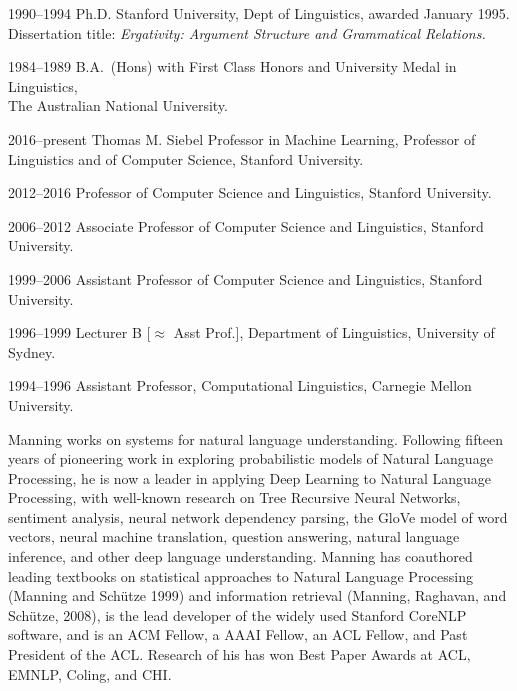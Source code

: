 \documentclass[11pt]{article}
\begin{document}
\begin{vita}
\begin{Professional Preparation}[1990--1994]
\item[1990--1994] Ph.D. Stanford University, Dept of
Linguistics, awarded January 1995.
Dissertation title: {\em Ergativity: Argument Structure and Grammatical
Relations.}
\item[1984--1989] B.A.\ (Hons) with First Class Honors and University
Medal in Linguistics,\\
The Australian National University.
\end{Professional Preparation}

\begin{Appointments}[1996--present]
\item[2016--present] Thomas M. Siebel Professor in Machine Learning, Professor of Linguistics and of Computer Science, Stanford University.
\item[2012--2016] Professor of Computer Science and Linguistics,
  Stanford University.
\item[2006--2012] Associate Professor of Computer Science and
Linguistics, Stanford University.
\item[1999--2006] Assistant Professor of Computer Science and
Linguistics, Stanford University.
\item[1996--1999] Lecturer B [$\approx$ Asst Prof.], %
Department of Linguistics, University of Sydney. 
\item[1994--1996] Assistant Professor,
Computational Linguistics,
Carnegie Mellon University.
\end{Appointments}

\begin{Synopsis}
\item
Manning works on systems for natural language understanding.
Following fifteen years of pioneering work in exploring probabilistic models
of Natural Language Processing, he is now a leader in
applying Deep Learning to Natural Language Processing, with well-known
research on Tree Recursive Neural Networks, sentiment analysis, neural
network dependency parsing, the GloVe model of word vectors, neural
machine translation, question answering, natural language inference,
and other deep language understanding. Manning has
coauthored leading textbooks on statistical approaches to Natural
Language Processing (Manning and Sch\"utze 1999) and information
retrieval (Manning, Raghavan, and Sch\"utze, 2008), is the lead
developer of the widely used Stanford CoreNLP software, and is an ACM Fellow,
a AAAI Fellow, an ACL Fellow, and Past President of the
ACL\@. Research of his has won Best Paper Awards at ACL, EMNLP, Coling, and CHI. 
\end{Synopsis}


\end{vita}
\end{document}
